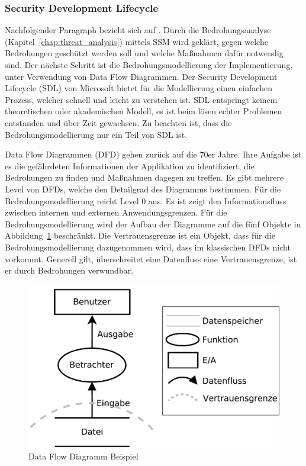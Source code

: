 \documentclass[11pt,a4paper]{report}
\begin{document}
\subsubsection{Security Development Lifecycle}

Nachfolgender Paragraph bezieht sich auf \cite{gutmann10}.
Durch die Bedrohungsanalyse (Kapitel~\ref{chap:threat_analysis}) mittels SSM wird geklärt, gegen welche Bedrohungen geschützt werden soll und welche Maßnahmen dafür notwendig sind. Der nächste Schritt ist die Bedrohungsmodellierung der Implementierung, unter Verwendung von Data Flow Diagrammen. Der Security Development Lifecycle (SDL) von Microsoft bietet für die Modellierung einen einfachen Prozess, welcher schnell und leicht zu verstehen ist. SDL entspringt keinem theoretischen oder akademischen Modell, es ist beim lösen echter Problemen entstanden und über Zeit gewachsen. Zu beachten ist, dass die Bedrohungsmodellierung nur ein Teil von SDL ist. 

Data Flow Diagrammen (DFD) gehen zurück auf die 70er Jahre. Ihre Aufgabe ist es die gefährdeten Informationen der Applikation zu identifiziert, die Bedrohungen zu finden und Maßnahmen dagegen zu treffen. Es gibt mehrere Level von DFDs, welche den Detailgrad des Diagramms bestimmen. Für die Bedrohungsmodellierung reicht Level 0 aus. Es ist zeigt den Informationsfluss zwischen internen und externen Anwendungsgrenzen. Für die Bedrohungsmodellierung wird der Aufbau der Diagramme auf die fünf Objekte in Abbildung~\ref{fig:dfd_intro} beschränkt. Die Vertrauensgrenze ist ein Objekt, dass für die Bedrohungsmodellierung dazugenommen wird, dass im klassischen DFDs nicht vorkommt. Generell gilt, überschreitet eine Datenfluss eine Vertrauensgrenze, ist er durch Bedrohungen verwundbar.

\begin{figure}[htbp]
\centering
\includegraphics[scale=0.4]{images/dfd_intro.pdf}
\caption{Data Flow Diagramm Beispiel}
\label{fig:dfd_intro}
\end{figure}
\end{document}
